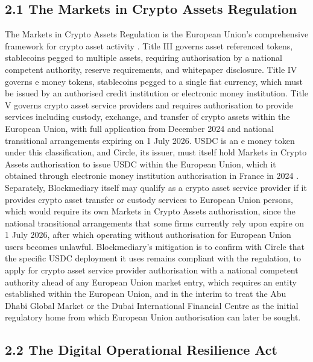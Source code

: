 \documentclass[12pt, a4paper]{article}
\begin{document}
\subsection*{2.1 The Markets in Crypto Assets Regulation}

The Markets in Crypto Assets Regulation is the European Union's comprehensive framework
for crypto asset activity \citep{mica2023}. Title III governs asset referenced tokens,
stablecoins pegged to multiple assets, requiring authorisation by a national competent
authority, reserve requirements, and whitepaper disclosure. Title IV governs e money
tokens, stablecoins pegged to a single fiat currency, which must be issued by an
authorised credit institution or electronic money institution. Title V governs crypto
asset service providers and requires authorisation to provide services including custody,
exchange, and transfer of crypto assets within the European Union, with full application
from December 2024 and national transitional arrangements expiring on 1 July 2026. USDC is
an e money token under this classification, and Circle, its issuer, must itself hold
Markets in Crypto Assets authorisation to issue USDC within the European Union, which it
obtained through electronic money institution authorisation in France in 2024
\citep{ebamica}. Separately, Blockmediary itself may qualify as a crypto asset service
provider if it provides crypto asset transfer or custody services to European Union
persons, which would require its own Markets in Crypto Assets authorisation, since the
national transitional arrangements that some firms currently rely upon expire on 1 July
2026, after which operating without authorisation for European Union users becomes
unlawful. Blockmediary's mitigation is to confirm with Circle that the specific USDC
deployment it uses remains compliant with the regulation, to apply for crypto asset
service provider authorisation with a national competent authority ahead of any European
Union market entry, which requires an entity established within the European Union, and in
the interim to treat the Abu Dhabi Global Market or the Dubai International Financial
Centre as the initial regulatory home from which European Union authorisation can later be
sought.

\subsection*{2.2 The Digital Operational Resilience Act}
\end{document}
